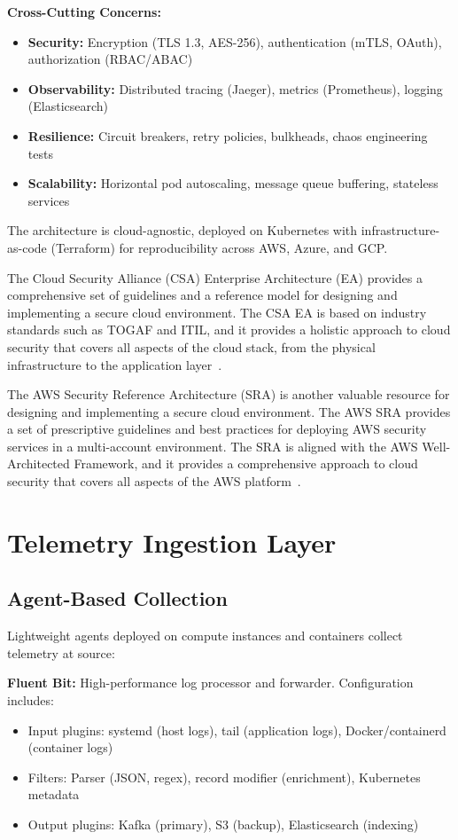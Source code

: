 \textbf{Cross-Cutting Concerns:}
\begin{itemize}
    \item \textbf{Security:} Encryption (TLS 1.3, AES-256), authentication (mTLS, OAuth), authorization (RBAC/ABAC)
    \item \textbf{Observability:} Distributed tracing (Jaeger), metrics (Prometheus), logging (Elasticsearch)
    \item \textbf{Resilience:} Circuit breakers, retry policies, bulkheads, chaos engineering tests
    \item \textbf{Scalability:} Horizontal pod autoscaling, message queue buffering, stateless services
\end{itemize}

The architecture is cloud-agnostic, deployed on Kubernetes with infrastructure-as-code (Terraform) for reproducibility across AWS, Azure, and GCP.

The Cloud Security Alliance (CSA) Enterprise Architecture (EA) provides a comprehensive set of guidelines and a reference model for designing and implementing a secure cloud environment. The CSA EA is based on industry standards such as TOGAF and ITIL, and it provides a holistic approach to cloud security that covers all aspects of the cloud stack, from the physical infrastructure to the application layer~\cite{csa2024ea}.

The AWS Security Reference Architecture (SRA) is another valuable resource for designing and implementing a secure cloud environment. The AWS SRA provides a set of prescriptive guidelines and best practices for deploying AWS security services in a multi-account environment. The SRA is aligned with the AWS Well-Architected Framework, and it provides a comprehensive approach to cloud security that covers all aspects of the AWS platform~\cite{aws2024sra}.

\section{Telemetry Ingestion Layer}\label{sec:arch-ingestion}
\subsection{Agent-Based Collection}
Lightweight agents deployed on compute instances and containers collect telemetry at source:

\textbf{Fluent Bit:} High-performance log processor and forwarder. Configuration includes:
\begin{itemize}
    \item Input plugins: systemd (host logs), tail (application logs), Docker/containerd (container logs)
    \item Filters: Parser (JSON, regex), record modifier (enrichment), Kubernetes metadata
    \item Output plugins: Kafka (primary), S3 (backup), Elasticsearch (indexing)
\end{itemize}

